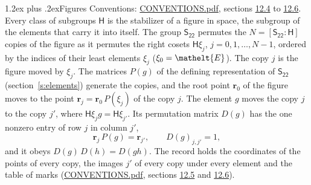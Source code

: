 \documentclass[10pt,a4paper]{article}
\makeatletter
\renewcommand\section{\@startsection{section}{1}{\z@}{-3ex plus -1ex minus -.2ex}%
  {1.2ex plus .2ex}{\normalfont\large\sffamily\bfseries\color{parttitle}}}
\numberwithin{equation}{section}
\newcommand{\eltfont}[1]{{\let\sigma\eltsigma\mathelt{#1}}}
\newcommand{\grp}[1]{\mathsf{#1}}
\newcommand{\cls}[1]{\eltfont{#1}}
\newcommand{\pointr}{\mathbf{r}}
\makeatother
\begin{document}
\section{Figures}\label{s:permutation}
Conventions: \href{../../CONVENTIONS.pdf}{CONVENTIONS.pdf}, sections \href{../../CONVENTIONS.pdf\#conv.12.4}{12.4} to \href{../../CONVENTIONS.pdf\#conv.12.6}{12.6}.
Every class of subgroups $\grp{H}$ is the stabilizer of a figure in space, the subgroup of the elements that carry it into itself. \label{n:local.orbit.size}\label{n:element.coset.least}\label{n:index.coset}The group $\grp{S_{22}}$ permutes the $N = [\grp{S_{22}} : \grp{H}]$ copies of the figure as it permutes the right cosets $\grp{H}\xi_j$, $j = 0, 1, \dots, N - 1$, ordered by the indices of their least elements $\xi_j$ ($\xi_0 = \cls{E}$). The copy $j$ is the figure moved by $\xi_j$. The matrices $P(g)$ of the defining representation of $\grp{S_{22}}$ (section~\ref{s:elements}) generate the copies, and the root point $\pointr_0$ of the figure moves to the point $\pointr_j = \pointr_0\, P(\xi_j)$ of the copy $j$. \label{n:local.coset.image}The element $g$ moves the copy $j$ to the copy $j'$, where $\grp{H}\xi_j g = \grp{H}\xi_{j'}$. \label{n:local.matrix.permutation}Its permutation matrix $D(g)$ has the one nonzero entry of row $j$ in column $j'$,
\begin{equation}\label{e:perm.matrix}\pointr_j\, P(g) = \pointr_{j'}, \qquad D(g)_{j,j'} = 1,\end{equation}
and it obeys $D(g)\, D(h) = D(gh)$. The record holds the coordinates of the points of every copy, the images $j'$ of every copy under every element and the table of marks (\href{../../CONVENTIONS.pdf}{CONVENTIONS.pdf}, sections \href{../../CONVENTIONS.pdf\#conv.12.5}{12.5} and \href{../../CONVENTIONS.pdf\#conv.12.6}{12.6}).
\end{document}
